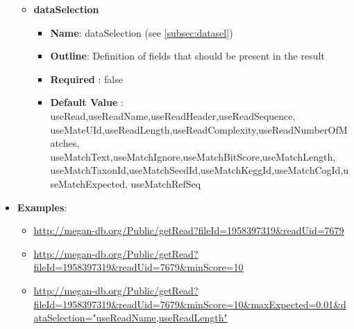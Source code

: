 \documentclass[11pt]{article}
\begin{document}
\begin{itemize}
\begin{itemize}
\begin{itemize}
				\end{itemize}
			\item \textbf{dataSelection}
				\begin{itemize}
					\item \textbf{Name}: dataSelection (see \ref{subsec:datasel})
					\item \textbf{Outline}: Definition of fields that should be present in the result
					\item \textbf{Required} : false
					\item \textbf{Default Value} : useRead,useReadName,useReadHeader,useReadSequence, useMateUId,useReadLength,useReadComplexity,useReadNumberOfMatches, useMatchText,useMatchIgnore,useMatchBitScore,useMatchLength, useMatchTaxonId,useMatchSeedId,useMatchKeggId,useMatchCogId,useMatchExpected, useMatchRefSeq
				\end{itemize}
		\end{itemize}
	\item \textbf{Examples}:
		\begin{itemize}
			\item \url{http://megan-db.org/Public/getRead?fileId=1958397319&readUid=7679}
			\item \url{http://megan-db.org/Public/getRead?fileId=1958397319&readUid=7679&minScore=10}
			\item \url{http://megan-db.org/Public/getRead?fileId=1958397319&readUid=7679&minScore=10&maxExpected=0.01&dataSelection="useReadName,useReadLength"}
		\end{itemize}
\end{itemize}
\end{document}
